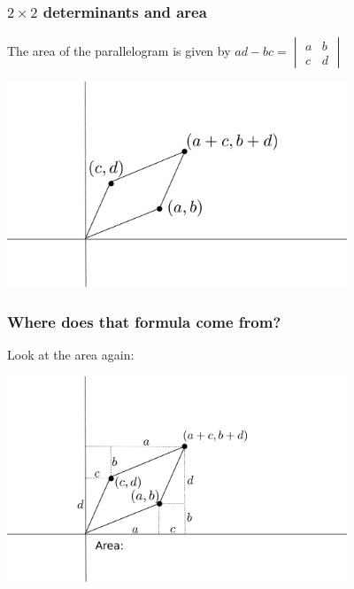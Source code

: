 \documentclass[11pt,t]{beamer}
\begin{document}
\begin{frame}\frametitle{$2\times 2$ determinants and area}
The \alert{area} of the parallelogram is given by $ad-bc = \begin{vmatrix}
a&b\\c&d
\end{vmatrix}$
\begin{center}
\includegraphics[width=4in]{parallelogram.pdf}
\end{center}
\end{frame}
\begin{frame}
\frametitle{Where does that formula come from?}
Look at the area again:
\begin{center}
\includegraphics[width=4in]{parallelogram2.pdf}
\end{center}
\end{frame}
\end{document}
